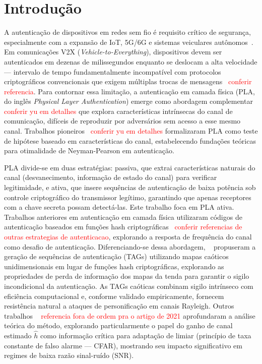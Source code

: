 \documentclass[12pt,a4paper]{article}
\newcommand{\rred}[1]{\textcolor{red}{#1}}
\begin{document}
\section{Introdução}

A autenticação de dispositivos em redes sem fio é requisito crítico de segurança, especialmente com a expansão de IoT, 5G/6G e sistemas veiculares autônomos~\cite{ref_xie}. Em comunicações V2X (\textit{Vehicle-to-Everything}), dispositivos devem ser autenticados em dezenas de milissegundos enquanto se deslocam a alta velocidade --- intervalo de tempo fundamentalmente incompatível com protocolos criptográficos convencionais que exigem múltiplas trocas de mensagens~\cite{ref_v2x_latency} \rred{conferir referencia}. Para contornar essa limitação, a autenticação em camada física (PLA, do inglês \textit{Physical Layer Authentication}) emerge como abordagem complementar~\cite{ref_poor, ref_yu} \rred{conferir yu em detalhes} que explora características intrínsecas do canal de comunicação, difíceis de reproduzir por adversários sem acesso a esse mesmo canal. Trabalhos pioneiros~\cite{ref_yu} \rred{conferir yu em detalhes}  formalizaram PLA como teste de hipótese baseado em características do canal, estabelecendo fundações teóricas para otimalidade de Neyman-Pearson em autenticação.

PLA divide-se em duas estratégias: passiva, que extrai características naturais do canal (desvanecimento, informação de estado do canal) para verificar legitimidade, e ativa, que insere sequências de autenticação de baixa potência sob controle criptográfico do transmissor legítimo, garantindo que apenas receptores com a chave secreta possam detectá-las. Este trabalho foca em PLA ativa. Trabalhos anteriores em autenticação em camada física utilizaram códigos de autenticação baseados em funções hash criptográficas~\cite{ref_hash_pla, ref_ldpc_auth} \rred{conferir referencias de outras estrategias de autenticacao}, explorando a resposta de frequência do canal como desafio de autenticação. Diferenciando-se dessa abordagem, ~\cite{ref_joao} propuseram a geração de sequências de autenticação (TAGs) utilizando mapas caóticos unidimensionais em lugar de funções hash criptográficas, explorando as propriedades de perda de informação dos mapas da tenda para garantir o sigilo incondicional da autenticação. As TAGs caóticas combinam sigilo intrínseco com eficiência computacional e, conforme validado empiricamente, fornecem resistência natural a ataques de personificação em canais Rayleigh. Outros trabalhos ~\cite{ref_xie} \rred{referencia fora de ordem pra o artigo de 2021} aprofundaram a análise teórica do método, explorando particularmente o papel do ganho de canal estimado $\hat{h}$ como informação crítica para adaptação de limiar (princípio de taxa constante de falso alarme --- CFAR), mostrando seu impacto significativo em regimes de baixa razão sinal-ruído (SNR).
\end{document}

